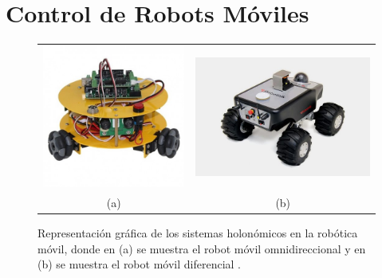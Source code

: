 \section{Control de Robots Móviles}
\begin{figure}%
      \begin{tabular}{cc}
        \includegraphics[width=.40\textwidth]{images/omnidirecional.jpg}&
        \includegraphics[width=.50\textwidth]{images/RM_noHolonomic.jpg}\\
        (a)&(b)
    \end{tabular}
  \captionsetup{font=footnotesize}
    \caption[Representación gráfica de los sistemas holonómicos en la robótica
    móvil, donde en (a) se muestra el robot móvil omnidireccional y en (b) se 
    muestra el robot móvil diferencial.]{Representación gráfica de los sistemas 
    holonómicos en la robótica móvil, donde en (a) se muestra el robot móvil 
    omnidireccional \cite{Omniwheel2018} y en (b) se muestra el robot móvil 
    diferencial \cite{NoHolonomic2018}.}
    \label{f:sLocomocion}
\end{figure}
